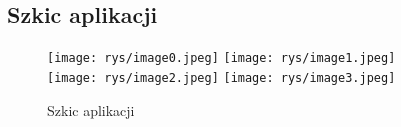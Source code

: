 \newpage
\subsection{Szkic aplikacji}  %
\begin{figure}[H]
\centering
    \texttt{[image: rys/image0.jpeg]}
    \texttt{[image: rys/image1.jpeg]} \\
    \texttt{[image: rys/image2.jpeg]}
    \texttt{[image: rys/image3.jpeg]}
    \caption{Szkic aplikacji}
    \label{fig:enter-label}
\end{figure}

 
 
 
 